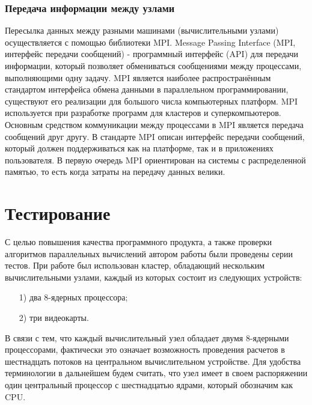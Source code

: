 \documentclass[a4paper, 14pt]{extarticle}
\theoremstyle{definition}
\begin{document}
\subsubsection{Передача информации между узлами}

\par Пересылка данных между разными машинами (вычислительными узлами) осуществляется с помощью библиотеки MPI. Message Passing Interface (MPI, интерфейс передачи сообщений) - программный интерфейс (API) для передачи информации, который позволяет обмениваться сообщениями между процессами, выполняющими одну задачу. MPI является наиболее распространённым стандартом интерфейса обмена данными в параллельном программировании, существуют его реализации для большого числа компьютерных платформ. MPI используется при разработке программ для кластеров и суперкомпьютеров. Основным средством коммуникации между процессами в MPI является передача сообщений друг другу. В стандарте MPI описан интерфейс передачи сообщений, который должен поддерживаться как на платформе, так и в приложениях пользователя. В первую очередь MPI ориентирован на системы с распределенной памятью, то есть когда затраты на передачу данных велики.





\section{Тестирование}

\par С целью повышения качества программного продукта, а также проверки алгоритмов параллельных вычислений автором работы были проведены серии тестов. При работе был использован кластер, обладающий нескольким вычислительными узлами, каждый из которых состоит из следующих устройств:

\begin{enumerate}
\item[1)] два 8-ядерных процессора;
\item[2)] три видеокарты.
\end{enumerate}

\par В связи с тем, что каждый вычислительный узел обладает двумя 8-ядерными процессорами, фактически это означает возможность проведения расчетов в шестнадцать потоков на центральном вычислительном устройстве. Для удобства терминологии в дальнейшем будем считать, что узел имеет в своем распоряжении один центральный процессор с шестнадцатью ядрами, который обозначим как CPU.
\end{document}
